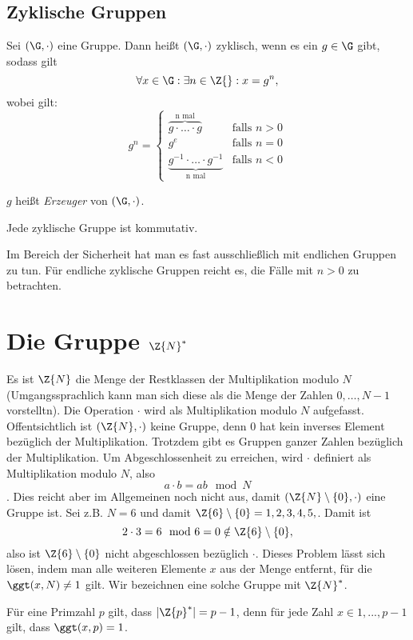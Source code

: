 \subsection{Zyklische Gruppen}
\begin{definition}
  Sei $(\G, \cdot)$ eine Gruppe. Dann heißt $(\G, \cdot)$ zyklisch, wenn
  es ein $g \in \G$ gibt, sodass gilt
  \[
    \forall x \in \G: \exists n \in \Z{}: x=g^n,
  \]
  wobei gilt:
\[
 g^n = 
  \begin{cases} 
   \overbrace{g \cdot \dotsc \cdot g}^{\text{n mal}} & \text{falls } n > 0 \\
   g^e       & \text{falls } n = 0 \\
   \underbrace{g^{-1} \cdot \dotsc \cdot g^{-1}}_{\text{n mal}} &
   \text{falls }n < 0
  \end{cases}
\]

$g$ heißt \textit{Erzeuger} von $(\G, \cdot)$. 
\end{definition}
Jede zyklische Gruppe ist kommutativ.

Im Bereich der Sicherheit hat man es fast ausschließlich mit endlichen
Gruppen zu tun. Für endliche zyklische Gruppen reicht es, die Fälle mit
$n>0$ zu betrachten. 
\section{Die Gruppe $\Z{N}^*$}
Es ist $\Z{N}$ die Menge der Restklassen der Multiplikation modulo $N$
(Umgangssprachlich kann man sich diese als die Menge der Zahlen
${0,\dots , N-1}$ vorstelltn). Die Operation $\cdot$ wird als
Multiplikation modulo $N$ aufgefasst. Offentsichtlich
ist $(\Z{N}, \cdot)$ keine Gruppe, denn $0$ hat kein inverses Element
bezüglich der Multiplikation.
Trotzdem gibt es Gruppen ganzer Zahlen bezüglich der
Multiplikation. Um Abgeschlossenheit zu erreichen, wird $\cdot$
definiert als Multiplikation modulo $N$, also 
\[a \cdot b = ab \mod N\]. Dies reicht aber im Allgemeinen noch nicht
aus, damit $(\Z{N}\setminus \{0\}, \cdot)$ eine Gruppe ist. Sei z.B. $N=6$ und
damit $\Z{6}\setminus \{0\} = {1,2,3,4,5,}$. Damit ist 
\[
2 \cdot 3 = 6 \mod 6 = 0 \notin \Z{6}\setminus \{0\},
\]
also ist $\Z{6}\setminus \{0\}$ nicht abgeschlossen bezüglich $\cdot$. 
Dieses Problem lässt sich lösen, indem man alle weiteren Elemente $x$ aus
der Menge entfernt, für die $\ggt(x, N)\neq 1$ gilt. Wir bezeichnen eine
solche Gruppe mit $\Z{N}^*$. 

Für eine Primzahl $p$ gilt, dass  $|\Z{p}^*|= p-1$, denn für jede Zahl $x\in
{1,..., p-1}$ gilt, dass $\ggt(x, p)=1$.